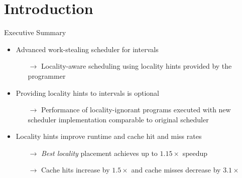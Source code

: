 \note{}


\section*{Introduction}

\begin{frame}{Executive Summary}
  \begin{itemize}
  \item Advanced work-stealing scheduler for intervals
    \begin{itemize}
    \item[$\rightarrow$] Locality-aware scheduling using locality
      hints provided by the programmer
    \end{itemize}
  \item Providing locality hints to intervals is optional
    \begin{itemize}
    \item[$\rightarrow$] Performance of locality-ignorant programs
      executed with new scheduler implementation comparable to
      original scheduler
    \end{itemize}
  \item Locality hints improve runtime and cache hit and miss rates
    \begin{itemize}
    \item[$\rightarrow$] \emph{Best locality} placement achieves up to
      $1.15\times$ speedup
    \item[$\rightarrow$] Cache hits increase by $1.5\times$ and cache
      misses decrease by $3.1\times$
    \end{itemize}
  \end{itemize}
\end{frame}


